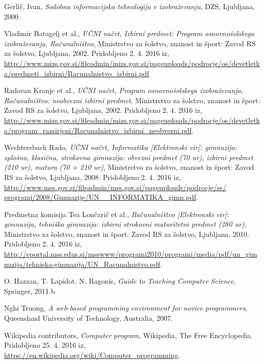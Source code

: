 \begin{thebibliography}{100}

 Gerlič, Ivan, \emph{Sodobna informacijska tehnologija v
    izobraževanju}, DZS, Ljubljana, 2000.

 Vladimir Batagelj et al., \emph{UČNI
    načrt, Izbirni predmet: Program osnovnošolskega izobraževanja,
    Računalništvo}, Ministrstvo za šolstvo, znanost in šport: Zavod RS
  za šolstvo, Ljubljana, 2002. Pridobljeno 2. 4. 2016 iz,
  \url{http://www.mizs.gov.si/fileadmin/mizs.gov.si/pageuploads/podrocje/os/devetletka/predmeti_izbirni/Racunalnistvo_izbirni.pdf}

 Radovan Kranjc et al., \emph{UČNI
    načrt, Program osnovnošolskega izobraževanja, Računalništvo:
    neobvezni izbirni predmet}, Ministrstvo za šolstvo, znanost in
  šport: Zavod RS za šolstvo, Ljubljana, 2002. Pridobljeno 2. 4. 2016
  iz,
  \url{http://www.mizs.gov.si/fileadmin/mizs.gov.si/pageuploads/podrocje/os/devetletka/program_razsirjeni/Racunalnistvo_izbirni_neobvezni.pdf}.

 Wechtersbach Rado, \emph{UČNI
    načrt, Informatika [Elektronski vir]: gimnazija: splošna,
    klasična, strokovna gimnazija: obvezni predmet (70 ur), izbirni
    predmet (210 ur), matura (70 + 210 ur)}, Ministrstvo za šolstvo,
  znanost in šport: Zavod RS za šolstvo, Ljubljana, 2008. Pridobljeno
  2. 4. 2016 iz,
  \url{http://www.mss.gov.si/fileadmin/mss.gov.si/pageuploads/podrocje/ss/ programi/2008/Gimnazije/UN__INFORMATIKA_gimn.pdf}.

 Predmetna komisija Tea Lončarič et al.,
  \emph{Računalništvo [Elektronski vir]: gimnazija, tehniška
    gimnazija: izbirni strokovni maturitetni predmet (280 ur)},
  Ministrstvo za šolstvo, znanost in šport: Zavod RS za šolstvo,
  Ljubljana, 2010. Pridobljeno 2. 4. 2016 iz,
  \url{http://eportal.mss.edus.si/msswww/programi2010/programi/media/pdf/un_gimnazija/tehniska-gimnazija/UN_Racunalnistvo.pdf}.

 O. Hazzan, T. Lapidot, N. Ragonis,
  \emph{Guide to Teaching Computer Science}, Springer, 2011.b

 Nghi Truong,
  \emph{A web-based programming environment for novice programmers},
  Queensland University of Technology, Australia, 2007.

 Wikipedia contributors, \emph{Computer
    program}, Wikipedia, The Free Encyclopedia. Pridobljeno 25. 4. 2016
  iz,
  \url{https://en.wikipedia.org/wiki/Computer_programming}.


\end{thebibliography}
